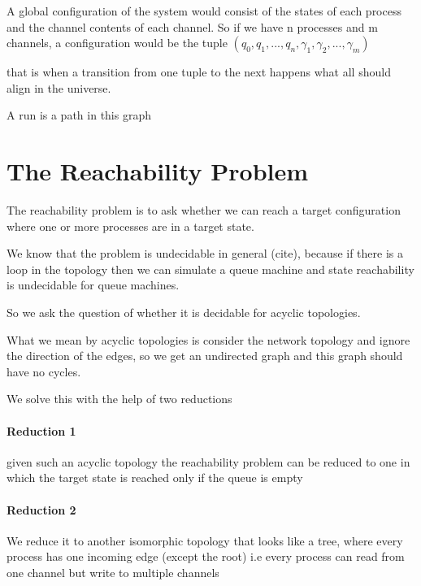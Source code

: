 \documentclass[a4paper,UKenglish,cleveref, autoref, thm-restate]{lipics-v2019}
\begin{document}

A global configuration of the system would consist of the states of each process and the channel contents of each channel. So if we have n processes and m channels, a configuration would be the tuple $(q_0, q_1, ..., q_n, \gamma_1, \gamma_2, ..., \gamma_m)$



that is when a transition from one tuple to the next happens what all should align in the universe.

A run is a path in this graph 


\section{The Reachability Problem}

The reachability problem is to ask whether we can reach a target configuration where one or more processes are in a target state.

We know that the problem is undecidable in general (cite), because if there is a loop in the topology then we can simulate a queue machine and state reachability is undecidable for queue machines. 

So we ask the question of whether it is decidable for acyclic topologies.

What we mean by acyclic topologies is consider the network topology and ignore the direction of the edges, so we get an undirected graph and this graph should have no cycles.

We solve this with the help of two reductions

\paragraph*{Reduction 1}

given such an acyclic topology the reachability problem can be reduced to one in which the target state is reached only if the queue is empty \cite{CQS}

\paragraph*{Reduction 2}
We reduce it to another isomorphic topology that looks like a tree, where every process has one incoming edge (except the root) i.e every process can read from one channel but write to multiple channels \cite{CQS}
\end{document}
